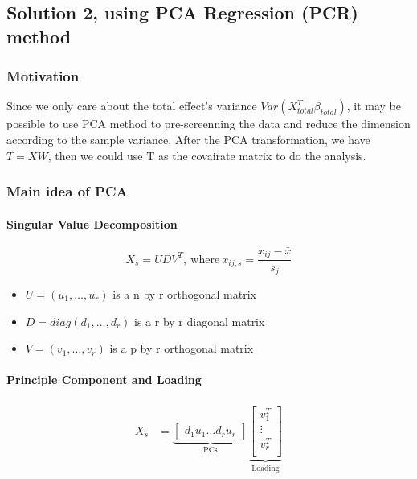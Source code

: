 \documentclass[]{article}
\providecommand{\tightlist}{%
  \setlength{\itemsep}{0pt}\setlength{\parskip}{0pt}}
\let\oldparagraph\paragraph
\renewcommand{\paragraph}[1]{\oldparagraph{#1}\mbox{}}
\begin{document}
\subsection{Solution 2, using PCA Regression (PCR)
method}\label{solution-2-using-pca-regression-pcr-method}

\subsubsection{Motivation}\label{motivation-2}

Since we only care about the total effect's variance
\(Var(X_{total}^T\beta_{total})\), it may be possible to use PCA method
to pre-screenning the data and reduce the dimension according to the
sample variance. After the PCA transformation, we have \(T = XW\), then
we could use T as the covairate matrix to do the analysis.

\subsubsection{Main idea of PCA}\label{main-idea-of-pca}

\paragraph{Singular Value
Decomposition}\label{singular-value-decomposition}

\[
  X_s = UDV^T, ~\text{where} ~x_{ij,s} = \frac{x_{ij} - \bar{x}}{s_j}
\]

\begin{itemize}
\tightlist
\item
  \(U = (u_1, \dots, u_r)\) is a n by r orthogonal matrix\\
\item
  \(D = diag(d_1, \dots, d_r)\) is a r by r diagonal matrix\\
\item
  \(V = (v_1, \dots, v_r)\) is a p by r orthogonal matrix
\end{itemize}

\paragraph{Principle Component and
Loading}\label{principle-component-and-loading}

\begin{align*} 
  X_s &= \underbrace{\begin{bmatrix} d_1u_1 \hdots  d_ru_r \end{bmatrix} }_\text{PCs}
         \underbrace{\begin{bmatrix} v_1^T \\
                         \vdots \\
                         v_r^T \\
         \end{bmatrix}}_\text{Loading}
\end{align*}
\end{document}
